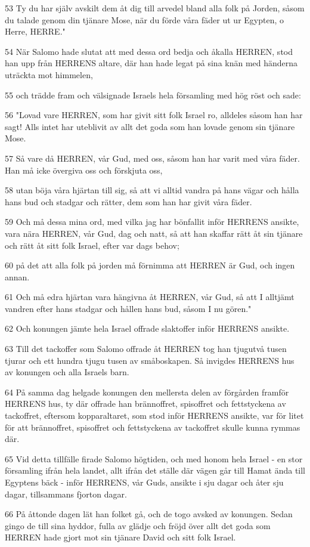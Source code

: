 \par 53 Ty du har själv avskilt dem åt dig till arvedel bland alla folk på Jorden, såsom du talade genom din tjänare Mose, när du förde våra fäder ut ur Egypten, o Herre, HERRE."
\par 54 När Salomo hade slutat att med dessa ord bedja och åkalla HERREN, stod han upp från HERRENS altare, där han hade legat på sina knän med händerna uträckta mot himmelen,
\par 55 och trädde fram och välsignade Israels hela församling med hög röst och sade:
\par 56 "Lovad vare HERREN, som har givit sitt folk Israel ro, alldeles såsom han har sagt! Alls intet har uteblivit av allt det goda som han lovade genom sin tjänare Mose.
\par 57 Så vare då HERREN, vår Gud, med oss, såsom han har varit med våra fäder. Han må icke övergiva oss och förskjuta oss,
\par 58 utan böja våra hjärtan till sig, så att vi alltid vandra på hans vägar och hålla hans bud och stadgar och rätter, dem som han har givit våra fäder.
\par 59 Och må dessa mina ord, med vilka jag har bönfallit inför HERRENS ansikte, vara nära HERREN, vår Gud, dag och natt, så att han skaffar rätt åt sin tjänare och rätt åt sitt folk Israel, efter var dags behov;
\par 60 på det att alla folk på jorden må förnimma att HERREN är Gud, och ingen annan.
\par 61 Och må edra hjärtan vara hängivna åt HERREN, vår Gud, så att I alltjämt vandren efter hans stadgar och hållen hans bud, såsom I nu gören."
\par 62 Och konungen jämte hela Israel offrade slaktoffer inför HERRENS ansikte.
\par 63 Till det tackoffer som Salomo offrade åt HERREN tog han tjugutvå tusen tjurar och ett hundra tjugu tusen av småboskapen. Så invigdes HERRENS hus av konungen och alla Israels barn.
\par 64 På samma dag helgade konungen den mellersta delen av förgården framför HERRENS hus, ty där offrade han brännoffret, spisoffret och fettstyckena av tackoffret, eftersom kopparaltaret, som stod inför HERRENS ansikte, var för litet för att brännoffret, spisoffret och fettstyckena av tackoffret skulle kunna rymmas där.
\par 65 Vid detta tillfälle firade Salomo högtiden, och med honom hela Israel - en stor församling ifrån hela landet, allt ifrån det ställe där vägen går till Hamat ända till Egyptens bäck - inför HERRENS, vår Guds, ansikte i sju dagar och åter sju dagar, tillsammans fjorton dagar.
\par 66 På åttonde dagen lät han folket gå, och de togo avsked av konungen. Sedan gingo de till sina hyddor, fulla av glädje och fröjd över allt det goda som HERREN hade gjort mot sin tjänare David och sitt folk Israel.

